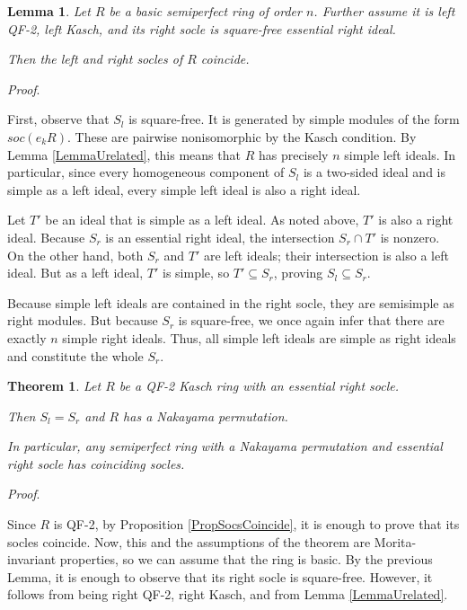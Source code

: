 \documentclass[11pt]{article}
\theoremstyle{plain}
\newtheorem{Lemma}[veta]{Lemma}
\newtheorem{Thm}[veta]{Theorem}
\theoremstyle{remark}
\theoremstyle{plain}
\newenvironment{Proof}{
  \par\medskip\noindent
  \textit{Proof}.
}{
\newline
\rightline{$\qedsymbol$}
}
\begin{document}
\begin{Lemma}
    Let $R$ be a basic semiperfect ring of order $n$. Further assume it is left QF-2, left Kasch, and its right socle is square-free essential right ideal.

    Then the left and right socles of $R$ coincide.
\end{Lemma}
\begin{Proof}
First, observe that $S_l$ is square-free. It is generated by simple modules of the form  $soc(e_kR)$. These are pairwise nonisomorphic by the Kasch condition.  By Lemma \ref{LemmaUrelated}, this means that $R$ has precisely $n$ simple left ideals. In particular, since every homogeneous component of $S_l$ is a two-sided ideal and is simple as a left ideal, every simple left ideal is also a right ideal.

    
   Let $T'$ be an ideal that is simple as a left ideal. As noted above, $T'$ is also a right ideal.  Because $S_r$ is an essential right ideal, the intersection $S_r\cap T'$ is nonzero. On the other hand, both $S_r$ and $T'$ are left ideals; their intersection is also a left ideal. But as a left ideal, $T'$ is simple, so $T'\subseteq S_r$, proving $S_l\subseteq S_r$.

    Because simple left ideals are contained in the right socle, they are semisimple as right modules. But because $S_r$ is square-free, we once again infer that there are exactly $n$ simple right ideals. Thus, all simple left ideals are simple as right ideals and constitute the whole $S_r$.
\end{Proof}
\begin{Thm}\label{PropQFKaschEss}
    Let $R$ be a QF-2 Kasch ring with an essential right socle.  

    Then $S_l=S_r$ and $R$ has a Nakayama permutation.

    In particular, any semiperfect ring with a Nakayama permutation and essential right socle has coinciding socles. 
\end{Thm}
\begin{Proof}
    Since $R$ is QF-2, by Proposition \ref{PropSocsCoincide}, it is enough to prove that its socles coincide. Now, this and the assumptions of the theorem are Morita-invariant properties, so we can assume that the ring is basic. By the previous Lemma, it is enough to observe that its right socle is square-free. However, it follows from being right QF-2, right Kasch, and from Lemma \ref{LemmaUrelated}. 
\end{Proof}
\end{document}
